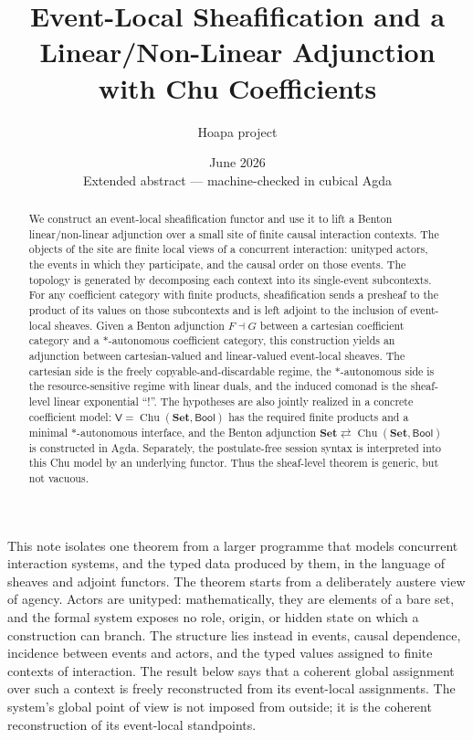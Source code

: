 \documentclass[11pt]{article}
\title{Event-Local Sheafification and a Linear/Non-Linear Adjunction\\
with Chu Coefficients}
\author{Hoapa project}
\date{June 2026 \\[2pt]
\normalsize Extended abstract --- machine-checked in cubical Agda}
\newcommand{\Vcat}{\mathsf{V}}
\newcommand{\Set}{\mathbf{Set}}
\newcommand{\Bool}{\mathsf{Bool}}
\newcommand{\Chu}{\operatorname{Chu}}
\begin{document}
\maketitle

\begin{abstract}
We construct an event-local sheafification functor and use it to lift a Benton
linear/non-linear adjunction over a small site of finite causal interaction
contexts. The objects of the site are finite local views of a concurrent
interaction: unityped actors, the events in which they participate, and the
causal order on those events. The topology is generated by
decomposing each context into its single-event subcontexts. For any coefficient
category with finite products,
sheafification sends a presheaf to the product of its values on those
subcontexts and is left adjoint to the inclusion of event-local sheaves. Given a
Benton adjunction $F\dashv G$ between a cartesian coefficient category and a
$*$-autonomous coefficient category, this construction yields an adjunction
between cartesian-valued and linear-valued event-local sheaves. The cartesian
side is the freely copyable-and-discardable regime, the $*$-autonomous side is
the resource-sensitive regime with linear duals, and the induced comonad is the
sheaf-level linear exponential ``$!$''. The hypotheses are also
jointly realized in a concrete coefficient model: $\Vcat=\Chu(\Set,\Bool)$ has
the required finite products and a minimal $*$-autonomous interface, and the
Benton adjunction $\Set\rightleftarrows\Chu(\Set,\Bool)$ is constructed in Agda.
Separately, the postulate-free session syntax is interpreted into this Chu model
by an underlying functor. Thus the sheaf-level theorem is generic, but not
vacuous.
\end{abstract}

This note isolates one theorem from a larger programme that models concurrent
interaction systems, and the typed data produced by them, in the language of
sheaves and adjoint functors. The theorem starts from a deliberately austere
view of agency. Actors are unityped: mathematically, they are elements of a bare
set, and the formal system exposes no role, origin, or hidden state on which a
construction can branch. The structure lies instead in events, causal
dependence, incidence between events and actors, and the typed values assigned
to finite contexts of interaction. The result below says that a coherent global
assignment over such a context is freely reconstructed from its event-local
assignments. The system's global point of view is not imposed from outside; it
is the coherent reconstruction of its event-local standpoints.
\end{document}
